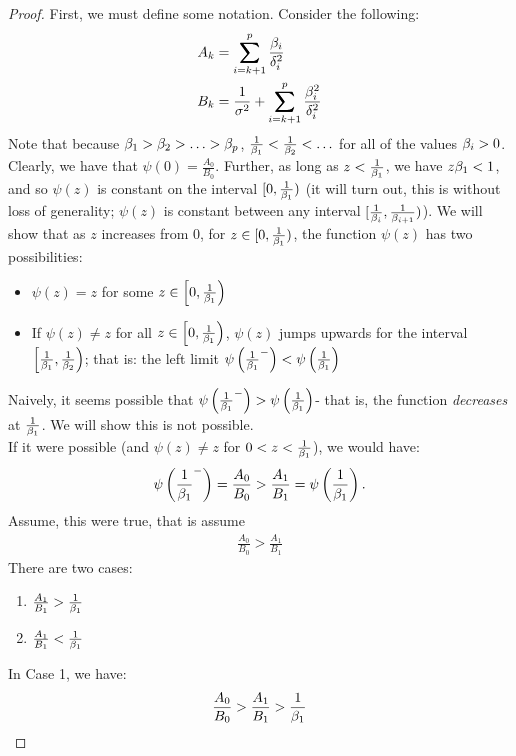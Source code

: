\documentclass[12pt,leqno,letterpaper]{article}
\begin{document}
\begin{proof}
First, we must define some notation.  Consider the following:
\begin{align*}
A_k &= \sum_{i={k+1}}^p \frac{\gb_i}{\gd_i^2}\\
B_k &= \frac{1}{\gs^2}+\sum_{i={k+1}}^p \frac{\gb_i^2}{\gd_i^2}
\end{align*}
Note that because $\beta_1>\beta_2>\ldots>\beta_p$, $\frac{1}{\beta_1}<\frac{1}{\beta_2}<\ldots$ for all of the values $\beta_i>0$.
Clearly, we have that $\psi(0)=\frac{A_0}{B_0}$.  Further, as long as $z<\frac{1}{\beta_1}$, we have $z \beta_1<1$, and so $\psi(z)$ is constant on the interval $[0,\frac{1}{\beta_1})$ (it will turn out, this is without loss of generality; $\psi(z)$ is constant between any interval $[\frac{1}{\beta_i},\frac{1}{\beta_{i+1}})$).  We will show that as $z$ increases from $0$, for $z \in [0,\frac{1}{\beta_1})$, the function $\psi(z)$ has two possibilities:
\begin{itemize}
\item $\psi(z)=z$ for some $z \in \left[0,\frac{1}{\beta_1}\right)$
\item If $\psi(z)\neq z$ for all $z \in \left[0,\frac{1}{\beta_1}\right)$, $\psi(z)$ jumps upwards for the interval $\left[\frac{1}{\beta_1},\frac{1}{\beta_2}\right)$; that is: the left limit $\psi\left(\frac{1}{\beta_1}^-\right)< \psi \left(\frac{1}{\beta_1}\right)$
\end{itemize}
Naively, it seems possible that $\psi\left(\frac{1}{\beta_1}^-\right)> \psi\left(\frac{1}{\beta_1}\right)$- that is, the function \textit{decreases} at $\frac{1}{\beta_1}$.  We will show this is not possible.\\
If it were possible (and $\psi(z)\neq z$ for $0<z<\frac{1}{\beta_1}$), we would have:
\begin{align}
\psi\left(\frac{1}{\beta_1}^-\right) = \frac{A_0}{B_0}> \frac{A_1}{B_1} = \psi\left(\frac{1}{\beta_1}\right).
\end{align}
Assume, this were true, that is assume
\begin{align}
\frac{A_0}{B_0} > \frac{A_1}{B_1}
\end{align}
There are two cases:
\begin{enumerate}
\item $\frac{A_1}{B_1}>\frac{1}{\beta_1}$
\item $\frac{A_1}{B_1}< \frac{1}{\beta_1}$
\end{enumerate}
In Case 1, we have:
\begin{align}
\frac{A_0}{B_0}>\frac{A_1}{B_1}> \frac{1}{\beta_1}
\end{align}

\end{proof}
\end{document}
